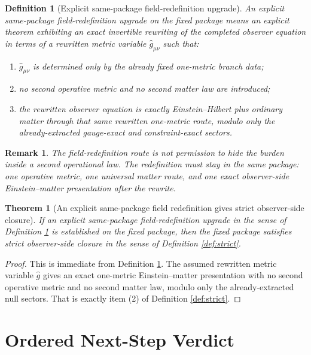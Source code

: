 \documentclass[11pt]{article}
\newcommand{\RedefMetric}{\widehat g}
\newtheorem{definition}{Definition}
\newtheorem{remark}{Remark}
\newtheorem{theorem}{Theorem}
\begin{document}
\begin{definition}[Explicit same-package field-redefinition upgrade]
\label{def:redef}
An \emph{explicit same-package field-redefinition upgrade} on the fixed package means an explicit theorem exhibiting an exact invertible rewriting of the completed observer equation in terms of a rewritten metric variable \(\RedefMetric_{\mu\nu}\) such that:
\begin{enumerate}
    \item \(\RedefMetric_{\mu\nu}\) is determined only by the already fixed one-metric branch data;
    \item no second operative metric and no second matter law are introduced;
    \item the rewritten observer equation is exactly Einstein--Hilbert plus ordinary matter through that same rewritten one-metric route, modulo only the already-extracted gauge-exact and constraint-exact sectors.
\end{enumerate}
\end{definition}

\begin{remark}
The field-redefinition route is not permission to hide the burden inside a second operational law. The redefinition must stay in the same package: one operative metric, one universal matter route, and one exact observer-side Einstein--matter presentation after the rewrite.
\end{remark}

\begin{theorem}[An explicit same-package field redefinition gives strict observer-side closure]
\label{thm:redef}
If an explicit same-package field-redefinition upgrade in the sense of Definition \ref{def:redef} is established on the fixed package, then the fixed package satisfies strict observer-side closure in the sense of Definition \ref{def:strict}.
\end{theorem}

\begin{proof}
This is immediate from Definition \ref{def:redef}. The assumed rewritten metric variable \(\RedefMetric\) gives an exact one-metric Einstein--matter presentation with no second operative metric and no second matter law, modulo only the already-extracted null sectors. That is exactly item (2) of Definition \ref{def:strict}.
\end{proof}

\section{Ordered Next-Step Verdict}
\end{document}
